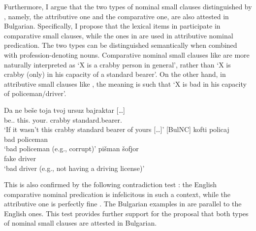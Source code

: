 \documentclass[output=paper]{langscibook}
\begin{document}
Furthermore, I argue that the two types of nominal small clauses distinguished by \citet{denDikken2006}, namely, the attributive one and the comparative one, are also attested in Bulgarian. Specifically, I propose that the lexical items in  participate in comparative small clauses, while the ones in  are used in attributive nominal predication. The two types can be distinguished semantically when combined with profession-denoting nouns. Comparative nominal small clauses like %
 are more naturally interpreted as `X is a crabby person in general', rather than `X is crabby (only) in his capacity of a standard bearer'. On the other hand, in attributive small clauses like , the meaning is such that `X is bad in his capacity of policeman/driver'. 

\ea \label{ge-ex-dem-pron}
\gll Da ne be\v{s}e toja tvoj ursuz {bajraktar [\ldots{}]}\\
\Comp{} \Neg{} be.\Pst{}.\Tsg{} this.\M{} your.\M{} crabby standard.bearer.\M{}\\
\glt `If it wasn't this crabby standard bearer of yours  [\ldots{}]' \hfill [BulNC]
\ex \label{ge-ex-attrsem}
\ea
\gll kofti policaj \\
bad policeman \\
\glt `bad policeman (e.g., corrupt)'
\ex pi\v{s}man \v{s}ofjor \\
fake driver \\
\glt `bad driver (e.g., not having a driving license)'
\z
\z

\noindent This is also confirmed by the following contradiction test \citep[see][170]{denDikken2006}: the English comparative nominal predication is infelicitous in such a context, while the attributive one is perfectly fine . %
The Bulgarian examples in  are parallel to the English ones. This test provides further support for the proposal that both types of nominal small clauses are attested in Bulgarian.

\judgewidth{\#}
\ea \label{ge-ex-eng-contra}
\z
\ex \label{ge-ex-bg-contra}
\z 
\z
\end{document}
